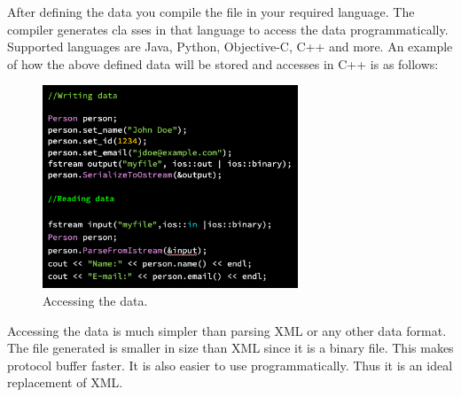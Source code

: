 \documentclass[12pt, conference, a4paper]{article}
\begin{document}
After defining the data you compile the file in your required language. The compiler generates cla	sses in that language to access the data programmatically. Supported languages are Java, Python, Objective-C, C++ and more. An example of how the above defined data will be stored and accesses in C++ is as follows:
\begin{figure}[H]
\begin{center}
  \includegraphics[width=3in]{access_data.png}
  \caption{Accessing the data.\cite{prot-buff}}
\end{center}
\end{figure}

Accessing the data is much simpler than parsing XML or any other data format. The file generated is smaller in size than XML since it is a binary file. This makes protocol buffer faster. It is also easier to use programmatically. Thus it is an ideal replacement of XML. 
\end{document}
